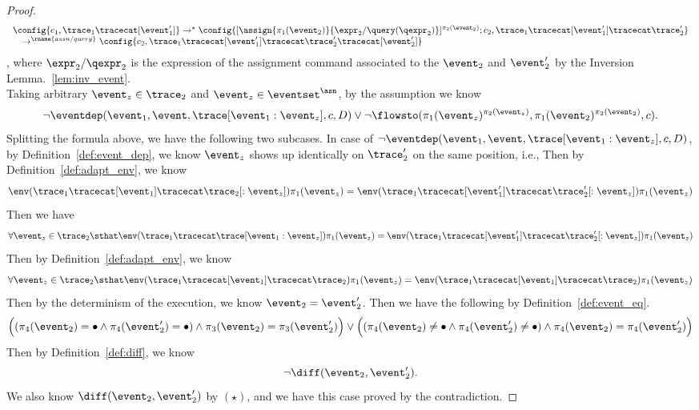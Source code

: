 \begin{proof}
\[\begin{array}{l}
		\config{c_1, \trace_1 \tracecat [\event_1']} \rightarrow^{*} \config{[\assign{\pi_1(\event_2)}{\expr_2 / \query(\qexpr_2)}]{}^{\pi_2(\event_2)};c_2, \trace_1 \tracecat [\event_1'] \tracecat \trace_2'} 
		\\ \quad
		\rightarrow^\rname{assn / query} \config{c_2, \trace_1 \tracecat [\event_1'] \tracecat \trace_2' \tracecat [\event_2']} 
	\end{array}
\]
, where $\expr_2 / \qexpr_2$ is the expression of the assignment command associated to the $\event_2$ and $\event_2'$ by the Inversion Lemma.~\ref{lem:inv_event}.
\\
Taking arbitrary $\event_z \in \trace_2$ and $\event_z \in \eventset^{\asn}$, by the assumption we know 
\[
\neg \eventdep(\event_1, \event, \trace[\event_1:\event_z], c, D)
\lor  \neg \flowsto(\pi_1(\event_z)^{\pi_2(\event_z)}, \pi_1(\event_2)^{\pi_2(\event_2)}, c).
\]
Splitting the formula above, we have the following two subcases.
In case of $\neg \eventdep(\event_1, \event, \trace[\event_1:\event_z], c, D)$,
by Definition~\ref{def:event_dep}, we know 
$\event_z$ shows up identically on $\trace_2'$ on the same position, i.e.,
Then by Definition~\ref{def:adapt_env}, we know 
\[
	\env(\trace_1 \tracecat [\event_1] \tracecat \trace_2[:\event_z]) \pi_1(\event_z) = \env(\trace_1 \tracecat [\event_1'] \tracecat \trace_2'[:\event_z]) \pi_1(\event_z)
\]
Then we have 
\[
	\forall \event_z \in \trace_2 \sthat 
	\env(\trace_1 \tracecat \trace[\event_1:\event_z]) \pi_1(\event_z) = \env(\trace_1 \tracecat [\event_1'] \tracecat \trace_2'[:\event_z]) \pi_1(\event_z)
\]
Then by Definition~\ref{def:adapt_env}, we know 
\[
	\forall \event_z \in \trace_2 \sthat 
	\env(\trace_1 \tracecat [\event_1] \tracecat \trace_2) \pi_1(\event_z) = \env(\trace_1 \tracecat [\event_1] \tracecat \trace_2) \pi_1(\event_z)
\]
Then by the determinism of the execution, we know $\event_2 = \event_2'$.
Then we have the following by Definition~\ref{def:event_eq}.
\[
	\Big( (\pi_4(\event_2) = \bullet \land \pi_4(\event_2') = \bullet) \land \pi_3(\event_2) = \pi_3(\event_2') \Big)
	\lor
		\Big((\pi_4(\event_2) \neq \bullet \land \pi_4(\event_2') \neq \bullet) \land \pi_4(\event_2) = \pi_4(\event_2') \Big)
		\]
Then by Definition~\ref{def:diff}, we know
\[
	\neg \diff(\event_2, \event_2').
	\]
We also know $\diff(\event_2, \event_2')$ by $(\star)$, and we have this case proved by the contradiction.

\end{proof}

